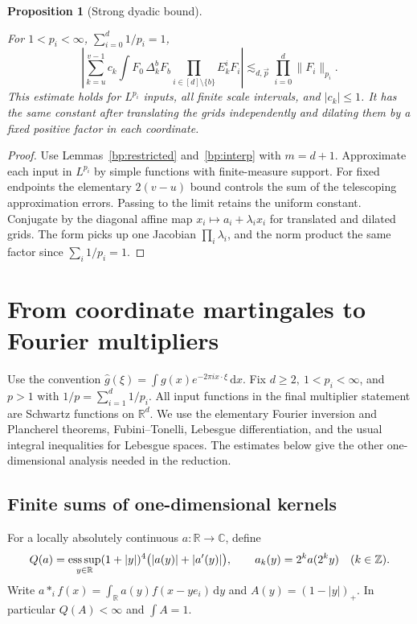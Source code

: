 \documentclass[11pt,letterpaper]{article}
\newtheorem{proposition}[theorem]{Proposition}
\theoremstyle{definition}
\newcommand{\R}{\mathbb R}
\newcommand{\dd}{\,\mathrm d}
\newcommand{\norm}[1]{\lVert#1\rVert}
\providecommand{\lean}[1]{}
\providecommand{\uses}[1]{}
\begin{document}
\begin{proposition}[Strong dyadic bound]\label{bp:dyadic}
\lean{TwistedParaproduct.dyadic}
For \(1<p_i<\infty\), \(\sum_{i=0}^d1/p_i=1\),
\[
 \left|\sum_{k=u}^{v-1}c_k\int F_0\,\Delta_k^b F_b
                     \prod_{i\in[d]\setminus\{b\}}E_k^i F_i\right|
          \lesssim_{d,\vec p} \prod_{i=0}^d\norm{F_i}_{p_i}.
\]
This estimate holds for \(L^{p_i}\) inputs, all finite scale intervals,
and \(|c_k|\le1\). It has the same constant after translating the
grids independently and dilating them by a fixed positive factor in
each coordinate.
\end{proposition}
\begin{proof}
\uses{bp:restricted,bp:interp,bp:haar-square}
Use Lemmas~\ref{bp:restricted} and~\ref{bp:interp}
with \(m=d+1\). Approximate each input in \(L^{p_i}\) by simple
functions with finite-measure support. For fixed endpoints the
elementary \(2(v-u)\) bound controls the sum of the telescoping
approximation errors. Passing to the limit retains the uniform
constant. Conjugate by the diagonal affine map
\(x_i\mapsto a_i+\lambda_i x_i\) for translated and dilated grids.
The form picks up one Jacobian \(\prod_i\lambda_i\), and the norm
product the same factor since \(\sum_i1/p_i=1\).
\end{proof}

\section{From coordinate martingales to Fourier multipliers}
\label{bp:fourier-section}

Use the convention \(\widehat g(\xi)=\int g(x)e^{-2\pi i x\cdot\xi}\dd x\).
Fix \(d\ge2,\ 1<p_i<\infty\), and \(p>1\) with
\(1/p=\sum_{i=1}^d1/p_i\). All input functions in the final multiplier
statement are Schwartz functions on \(\R^d\). We use the elementary
Fourier inversion and Plancherel theorems, Fubini--Tonelli,
Lebesgue differentiation, and the usual integral inequalities for
Lebesgue spaces. The estimates below give the other one-dimensional
analysis needed in the reduction.

\subsection{Finite sums of one-dimensional kernels}
For a locally absolutely continuous \(a:\R\to\mathbb C\), define
\[
 Q(a)=\mathop{\rm ess\,sup}_{y\in\R}
 (1+|y|)^4\bigl(|a(y)|+|a'(y)|\bigr),\qquad
 a_k(y)=2^k a(2^k y)\quad(k\in\mathbb Z).
\]
Write \(a*_i f(x)=\int_\R a(y)f(x-ye_i)\dd y\) and
\(A(y)=(1-|y|)_+\). In particular \(Q(A)<\infty\) and \(\int A=1\).
\end{document}
